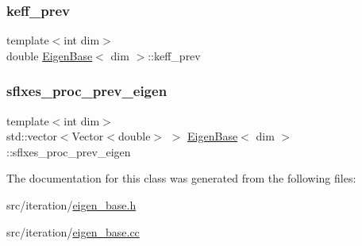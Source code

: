 \mbox{\label{class_eigen_base_a1499f0cb877e5dff2013328e06a29b4a}} 
\subsubsection{\texorpdfstring{keff\+\_\+prev}{keff\_prev}}
{\footnotesize\ttfamily template$<$int dim$>$ \\
double \hyperlink{class_eigen_base}{Eigen\+Base}$<$ dim $>$\+::keff\+\_\+prev\hspace{0.3cm}{\ttfamily [protected]}}

\mbox{\label{class_eigen_base_aec9885df50ea40a18fd5708061139843}} 
\subsubsection{\texorpdfstring{sflxes\+\_\+proc\+\_\+prev\+\_\+eigen}{sflxes\_proc\_prev\_eigen}}
{\footnotesize\ttfamily template$<$int dim$>$ \\
std\+::vector$<$Vector$<$double$>$ $>$ \hyperlink{class_eigen_base}{Eigen\+Base}$<$ dim $>$\+::sflxes\+\_\+proc\+\_\+prev\+\_\+eigen\hspace{0.3cm}{\ttfamily [protected]}}



The documentation for this class was generated from the following files\+:\begin{DoxyCompactItemize}
\item 
src/iteration/\hyperlink{eigen__base_8h}{eigen\+\_\+base.\+h}\item 
src/iteration/\hyperlink{eigen__base_8cc}{eigen\+\_\+base.\+cc}\end{DoxyCompactItemize}
